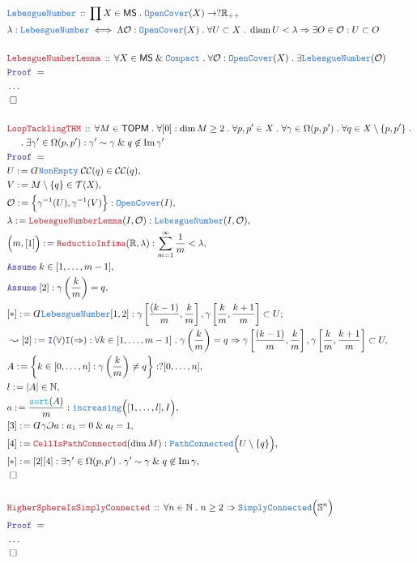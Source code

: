 \documentclass[12pt]{scrartcl}
\newcommand{\TYPE}[1]{\textcolor{NavyBlue}{\mathtt{#1}}}
\newcommand{\FUNC}[1]{\textcolor{Cerulean}{\mathtt{#1}}}
\newcommand{\LOGIC}[1]{\textcolor{Blue}{\mathtt{#1}}}
\newcommand{\THM}[1]{\textcolor{Maroon}{\mathtt{#1}}}
\renewcommand{\.}{\; . \;}
\newcommand{\de}{: \kern 0.1pc =}
\newcommand{\Theorem}[2]{& \THM{#1} \, :: \, #2 \\ & \Proof = \\ }
\newcommand{\DeclareType}[2]{& \TYPE{#1} \, :: \, #2 \\}
\newcommand{\DefineType}[3]{& #1 : \TYPE{#2} \iff #3 \\}
\newcommand{\NewLine}{\\ & \kern 1pc}
\newcommand{\Page}[1]{ \begin{align*} #1 \end{align*}   }
\newcommand{ \bd }{ \ByDef }
\newcommand{\NoProof}{ & \ldots \\ \EndProof}
\renewcommand{\And}{\; \& \;}
\newcommand{\Imply}{\Rightarrow}
\newcommand{\Intro}{\LOGIC{I}}
\newcommand{\Reals}{\mathbb{R} }
\newcommand{\Sphere}{\mathbb{S}}
\newcommand{\Nat}{\mathbb{N} }
\DeclareMathOperator*{\im}{Im}
\newcommand{\Say}[3]{& #1 \de #2 : #3, \\}
\newcommand{\SayIn}[3]{& #1 \de #2 \in #3, \\}
\newcommand{\Conclude}[3]{& #1 \de #2 : #3; \\}
\newcommand{\Derive}[3]{& \leadsto #1 \de #2 : #3, \\}
\newcommand{\Assume}[2]{& \LOGIC{Assume} \; #1 : #2, \\}
\newcommand{\AssumeIn}[2]{& \LOGIC{Assume} \; #1 \in #2, \\}
\newcommand{\QED}{\; \square}
\newcommand{\EndProof}{& \QED \\}
\newcommand{\ByDef}{\rotatebox[origin=c]{-180}{$D$}}%
\newcommand{\ByConstr}{\rotatebox[origin=c]{-180}{$C$}}%
\newcommand{\Proof}{\LOGIC{Proof} \; }
\newcommand{\C}{\mathcal{C}}
\newcommand{\T}{\mathcal{T}}
\DeclareMathOperator{\diam}{diam}
\newcommand{\MS}{\mathsf{MS}}
\newcommand{\TOPM}{\mathsf{TOPM}}
\begin{document}
\Page{
	\DeclareType{LebesgueNumber}
	{
		\prod X \in \MS \. 
		\TYPE{OpenCover}(X) \to
		?\Reals_{++}
	}
	\DefineType{\lambda}{LebesgueNumber}
	{
		\Lambda \mathcal{O} : \TYPE{OpenCover}(X) \.
		\forall U \subset X \. 
		\diam U  < \lambda \Imply
		\exists O \in \mathcal{O} : 
		U \subset O
	}
	\\
	\Theorem{LebesgueNumberLemma}
	{
		\forall X \in \MS \And \TYPE{Compact} \.
		\forall \mathcal{O} : \TYPE{OpenCover}(X) \.
		\exists \TYPE{LebesgueNumber}(\mathcal{O})
	}
	\NoProof
	\\
	\Theorem{LoopTacklingTHM}
	{
		\forall M \in \TOPM \. 
		\forall [0] : \dim M \ge 2 \.
		\forall p, p' \in X \.
		\forall \gamma \in \Omega(p,p') \.
		\forall q \in X \setminus \{p,p'\} \. \NewLine \. 
		\exists \gamma' \in \Omega(p,p') :
		\gamma' \sim \gamma 
		\And
		q \not \in \im \gamma'
	}
	\SayIn{U}{\bd \TYPE{NonEmpty}\;\C\C(q)}{\C\C(q)}
	\SayIn{V}{M \setminus \{q\}}{\T(X)}
	\Say{\mathcal{O}}{\Big\{ \gamma^{-1}(U), \gamma^{-1}(V)  \Big\}}
	{
		\TYPE{OpenCover}(I)
	}
	\Say{\lambda}{\THM{LebesgueNumberLemma}(I,\mathcal{O})}{\TYPE{LebesgueNumber}(I,\mathcal{O})}
	\Say{\Big(m,[1]\Big)}{\THM{ReductioInfima}(\Reals,\lambda)}
	{
		\sum_{m=1}^\infty \frac{1}{m} < \lambda
	}
	\AssumeIn{k}{[1,\ldots,m-1]}
	\Assume{[2]}{\gamma\left( \frac{k}{m} \right)=q}
	\Conclude{[*]}{\bd \TYPE{LebesgueNumber}[1,2]}
	{
		\gamma\left[\frac{(k-1)}{m},\frac{k}{m}\right],
		\gamma\left[\frac{k}{m}, \frac{k+1}{m}\right] \subset U
	}
	\Derive{[2]}{\Intro(\forall)\Intro(\Imply)}
	{
		\forall k \in [1,\ldots,m-1] \.
		\gamma\left( \frac{k}{m} \right)=q
		\Imply
		\gamma\left[\frac{(k-1)}{m},\frac{k}{m}\right],
		\gamma\left[\frac{k}{m}, \frac{k+1}{m}\right] \subset U
	}
	\Say{A}{\left\{ k \in [0,\ldots,n] :  \gamma\left(\frac{k}{m}\right) \neq q  \right\}}
	{
		?[0,\ldots,n]
	}
	\SayIn{l}{|A|}{\Nat}
	\Say{a}{\frac{\FUNC{sort}(A)}{m}}{ \TYPE{increasing}\Big( [1,\ldots,l], I\Big)}
	\Say{[3]}{\bd \gamma \ByConstr a}{a_1 = 0 \And a_l = 1}
	\Say{[4]}{\THM{CellIsPathConnected}(\dim M)}{\TYPE{PathConnected}\Big(U \setminus \{q\}\Big)}
	\Say{[*]}{[2][4]}{\exists \gamma' \in \Omega(p,p') \. \gamma'\sim \gamma \And q \not \in \im \gamma}
	\EndProof
	\\
	\Theorem{HigherSphereIsSimplyConnected}
	{
		\forall n \in \Nat \.
		n \ge 2 
		\Imply
		\TYPE{SimplyConnected}\Big(\Sphere^n\Big)
	}
	\NoProof
}
\end{document}
